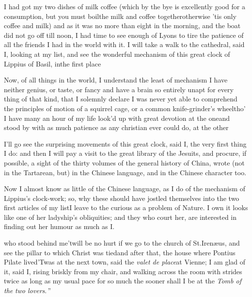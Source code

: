 \documentclass{article}
\begin{document}
I had got my two dishes of milk coffee (which by the bye is
excellently good for a consumption, but you must boil\break the milk
and coffee together\tsk otherwise ’tis only coffee and milk)\tsk
and as it was no more than eight in the morning, and the boat
did not go off till noon, I had time to see enough of Lyons to
tire the patience of all the friends I had in the world with it.
I will take a walk to the cathedral, said I, looking at my list,
and see the wonderful mechanism of this great clock of Lippius
of Basil, in\break the first place\tsh

Now, of all things in the world, I
understand the least of mechanism\tsh\break
I have neither genius, or taste, or fancy\break
\tsk and have a brain so entirely unapt for
every
thing of that kind, that I solemnly declare I was never yet able to comprehend the
principles of motion of a squirrel cage, or a common knife-grinder’s wheel\tsk tho’ I
have many an hour of my life look’d up with great devotion at the one\tsk and stood by
with as much patience as any christian ever could do, at the other\tsh

I’ll go see the surprising movements of this great clock, said I, the very first
thing I do: and then I will pay a visit to the great library of the Jesuits, and
procure, if possible, a sight of the thirty volumes of the general history of China,
wrote (not in the Tartarean, but) in the Chinese language, and in the Chinese
character too.

Now I almost know as little of the\break
Chinese language, as I do of the mechanism of
Lippius’s clock-work; so,\break
why these should have jostled themselves into the two
first articles of my list\tsh I leave to the curious as a problem of Nature.  I own
it looks like one of her ladyship’s obliquities; and they who court her, are
interested in finding out her humour as much as I.

\noindent
{}\break
{}
who stood behind me\tsh ’twill be no hurt if we go to the church of
St.\@ Irenæus, and see the pillar to which Christ was tied\tsh and after that, the
house where Pontius Pilate lived\tsh ’Twas at
the next town, said the \textit{valet de place}\tsk at Vienne; I
am glad of it, said I, rising briskly from my chair, and walking
across the room with strides twice as long as my usual pace\tsh
\lqq for so much\break
\lqq the sooner shall I be at the \textit{Tomb of the}\break
\lqq \textit{two lovers}.\,”
\end{document}

